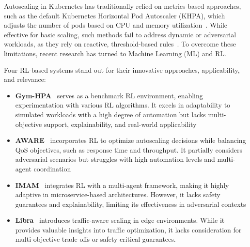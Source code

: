 \documentclass[conference]{IEEEtran}
\begin{document}
Autoscaling in Kubernetes has traditionally relied on metrics-based approaches, such as the default Kubernetes Horizontal Pod Autoscaler (KHPA), which adjusts the number of pods based on CPU and memory utilization~\cite{KubernetesChallenges}. While effective for basic scaling, such methods fail to address dynamic or adversarial workloads, as they rely on reactive, threshold-based rules~\cite{AutoscalingLimitations}. To overcome these limitations, recent research has turned to Machine Learning (ML) and RL.

Four RL-based systems stand out for their innovative approaches, applicability, and relevance:
%
\begin{itemize}
    \item \textbf{Gym-HPA}~\cite{gymhpa2022} serves as a benchmark RL environment, enabling experimentation with various RL algorithms. It excels in adaptability to simulated workloads with a high degree of automation but lacks multi-objective support, explainability, and real-world applicability
    \item \textbf{AWARE}~\cite{aware2023} incorporates RL to optimize autoscaling decisions while balancing QoS objectives, such as response time and throughput. It partially considers adversarial scenarios but struggles with high automation levels and multi-agent coordination
    \item \textbf{IMAM}~\cite{imam2022} integrates RL with a multi-agent framework, making it highly adaptive in microservice-based architectures. However, it lacks safety guarantees and explainability, limiting its effectiveness in adversarial contexts
    \item \textbf{Libra}~\cite{Libra} introduces traffic-aware scaling in edge environments. While it provides valuable insights into traffic optimization, it lacks consideration for multi-objective trade-offs or safety-critical guarantees.
\end{itemize}
\end{document}
